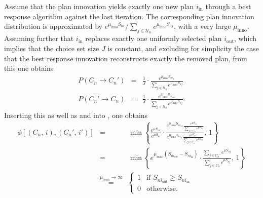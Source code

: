 Assume that the plan innovation yields exactly
one new plan $i_{\text{in}}$ through a
best response algorithm
%
%
against the last iteration.
%
%
The corresponding plan innovation distribution is
approximated by $e^{\mu_{\text{inno}}S_{ni}}/\sum_{j\in \mathcal{U}_n}e^{\mu_{\text{inno}}S_{nj}}$,
with a very large $\mu_{\text{inno}}$. Assuming further that $i_{\text{in}}$
replaces exactly one uniformly selected plan $i_{\text{out}}$, 
which implies that the choice set size $J$ is constant, 
and excluding for simplicity the case that the best response innovation
reconstructs exactly the removed plan,
from this one obtains
\begin{eqnarray}
P(C_{n}\rightarrow C_{n}') & = & \frac{1}{J}\cdot\frac{e^{\mu_{\text{inno}}S_{ni_{\text{in}}}}}{\sum_{j\in \mathcal{U}_n}e^{\mu_{\text{inno}}S_{nj}}}\\
P(C_{n}'\rightarrow C_{n}) & = & \frac{1}{J}\cdot\frac{e^{\mu_{\text{inno}}S_{ni_{\text{out}}}}}{\sum_{j\in \mathcal{U}_n}e^{\mu_{\text{inno}}S_{nj}}}.
\end{eqnarray}
Inserting this as well as  and 
into , one obtains 
\begin{eqnarray}
\phi[(C_{n},\, i),(C_{n}',\, i')] & = & 
\min\left\{ 
\frac{e^{\mu S_{ni'}}}{e^{\mu S_{ni}}}\cdot
\frac{{\displaystyle e^{\mu_{\text{inno}}S_{ni_{\text{out}}}}\frac{\displaystyle e^{\mu S_{ni}}}{\sum_{j\in C_{n}}\displaystyle e^{\mu S_{nj}}}}}
{{\displaystyle e^{\mu_{\text{inno}}S_{ni_{\text{in}}}}\frac{\displaystyle e^{\mu S_{ni'}}}{\sum_{j\in C_{n}'} \displaystyle e^{\mu S_{nj}}}}},\,1\right\} \\
 & = & 
 \min\left\{ 
 {\displaystyle e^{\mu_{\text{inno}}(S_{ni_{\text{out}}}-S_{ni_{\text{in}}})}} \cdot
 \frac{\sum_{j\in C_{n}'} \displaystyle e^{\mu S_{nj}}}{\sum_{j\in C_{n}} \displaystyle e^{\mu S_{nj}}},\,1\right\} \\[.5em]
\label{eq:limiting-accept-proba}
& \stackrel{\mu_{\text{inno}}\rightarrow\infty}{=} & 
\begin{cases}
1 & \text{if } S_{ni_{\text{out}}}\geq S_{ni_{\text{in}}} \\
0 & \text{otherwise.}
\end{cases}
\end{eqnarray}
